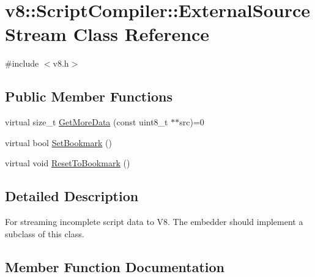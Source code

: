 \hypertarget{classv8_1_1ScriptCompiler_1_1ExternalSourceStream}{}\section{v8\+:\+:Script\+Compiler\+:\+:External\+Source\+Stream Class Reference}
\label{classv8_1_1ScriptCompiler_1_1ExternalSourceStream}


{\ttfamily \#include $<$v8.\+h$>$}

\subsection*{Public Member Functions}
\begin{DoxyCompactItemize}
\item 
virtual size\+\_\+t \mbox{\hyperlink{classv8_1_1ScriptCompiler_1_1ExternalSourceStream_ac3a0221b5725f0b612a6342d8e83d899}{Get\+More\+Data}} (const uint8\+\_\+t $\ast$$\ast$src)=0
\item 
virtual bool \mbox{\hyperlink{classv8_1_1ScriptCompiler_1_1ExternalSourceStream_a6848508547b3508a2d016738f12561e8}{Set\+Bookmark}} ()
\item 
virtual void \mbox{\hyperlink{classv8_1_1ScriptCompiler_1_1ExternalSourceStream_a425cf1ba265eeca194b805fe5c52bc19}{Reset\+To\+Bookmark}} ()
\end{DoxyCompactItemize}


\subsection{Detailed Description}
For streaming incomplete script data to V8. The embedder should implement a subclass of this class. 

\subsection{Member Function Documentation}
\mbox{\label{classv8_1_1ScriptCompiler_1_1ExternalSourceStream_ac3a0221b5725f0b612a6342d8e83d899}} 
